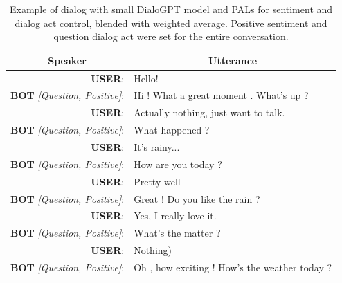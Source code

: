 \documentclass[11pt]{article}
\begin{document}
\begin{table}[]
\begin{tabular}{rl}
\multicolumn{1}{c}{Speaker}   & \multicolumn{1}{c}{Utterance}                 \\ \hline
\textbf{USER}:                         & Hello!                                        \\
\textbf{BOT} \textit{{[}Question, Positive{]}}: & Hi ! What a great moment . What's up ?        \\
\textbf{USER}:                         & Actually nothing, just want to talk.          \\
\textbf{BOT} \textit{{[}Question, Positive{]}}: & What happened ?                               \\
\textbf{USER}:                         & It's rainy...                                 \\
\textbf{BOT} \textit{{[}Question, Positive{]}}: & How are you today ?                           \\
\textbf{USER}:                         & Pretty well                                   \\
\textbf{BOT} \textit{{[}Question, Positive{]}}: & Great ! Do you like the rain ?                \\
\textbf{USER}:                         & Yes, I really love it.                        \\
\textbf{BOT} \textit{{[}Question, Positive{]}}: & What's the matter ?                           \\
\textbf{USER}:                         & Nothing)                                      \\
\textbf{BOT} \textit{{[}Question, Positive{]}}: & Oh , how exciting ! How's the weather today ?
\end{tabular}
\caption{Example of dialog with small DialoGPT model and PALs for sentiment and dialog act control, blended with weighted average. Positive sentiment and question dialog act were set for the entire conversation.}
\label{tab:example_pos_question_dialog}
\end{table}
\end{document}
